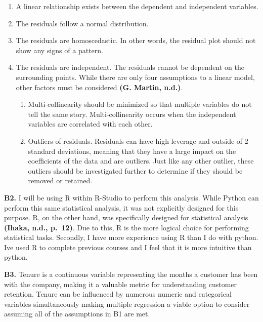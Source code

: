 \documentclass[
]{article}
\begin{document}
\begin{enumerate}
\def\labelenumi{\arabic{enumi}.}
\item
  A linear relationship exists between the dependent and independent
  variables.
\item
  The residuals follow a normal distribution.
\item
  The residuals are homoscedastic. In other words, the residual plot
  should not show any signs of a pattern.
\item
  The residuals are independent. The residuals cannot be dependent on
  the surrounding points. While there are only four assumptions to a
  linear model, other factors must be considered \textbf{(G. Martin,
  n.d.)}.

  \begin{enumerate}
  \def\labelenumii{\arabic{enumii}.}
  \item
    Multi-collinearity should be minimized so that multiple variables do
    not tell the same story. Multi-collinearity occurs when the
    independent variables are correlated with each other.
  \item
    Outliers of residuals. Residuals can have high leverage and outside
    of 2 standard deviations, meaning that they have a large impact on
    the coefficients of the data and are outliers. Just like any other
    outlier, these outliers should be investigated further to determine
    if they should be removed or retained.
  \end{enumerate}
\end{enumerate}

\textbf{B2.} I will be using R within R-Studio to perform this analysis.
While Python can perform this same statistical analysis, it was not
explicitly designed for this purpose. R, on the other hand, was
specifically designed for statistical analysis \textbf{(Ihaka, n.d.,
p.~12)}. Due to this, R is the more logical choice for performing
statistical tasks. Secondly, I have more experience using R than I do
with python. Ive used R to complete previous courses and I feel that it
is more intuitive than python.~

\textbf{B3.} Tenure is a continuous variable representing the months a
customer has been with the company, making it a valuable metric for
understanding customer retention. Tenure can be influenced by numerous
numeric and categorical variables simultaneously making multiple
regression a viable option to consider assuming all of the assumptions
in B1 are met.~
\end{document}
